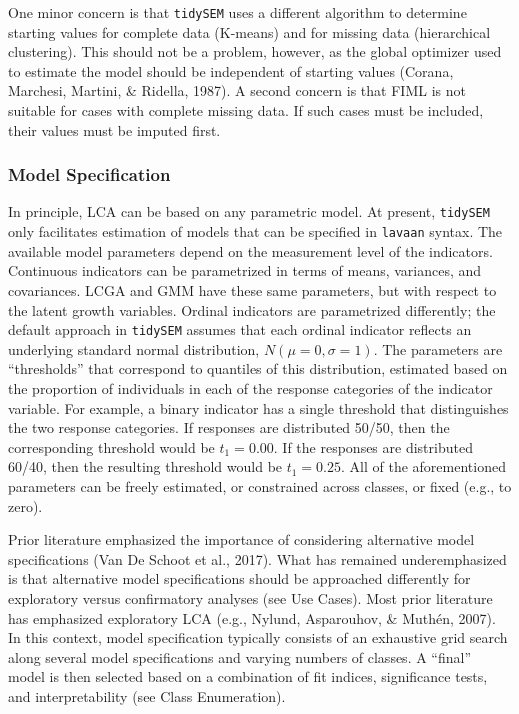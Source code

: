 \documentclass[
  ,man,floatsintext]{apa6}
\begin{document}
One minor concern is that \texttt{tidySEM} uses a different algorithm to determine starting values for complete data (K-means) and for missing data (hierarchical clustering).
This should not be a problem, however, as the global optimizer used to estimate the model should be independent of starting values (Corana, Marchesi, Martini, \& Ridella, 1987).
A second concern is that FIML is not suitable for cases with complete missing data.
If such cases must be included, their values must be imputed first.

\hypertarget{model-specification}{%
\subsubsection{Model Specification}\label{model-specification}}

In principle, LCA can be based on any parametric model.
At present, \texttt{tidySEM} only facilitates estimation of models that can be specified in \texttt{lavaan} syntax.
The available model parameters depend on the measurement level of the indicators.
Continuous indicators can be parametrized in terms of means, variances, and covariances.
LCGA and GMM have these same parameters,
but with respect to the latent growth variables.
Ordinal indicators are parametrized differently;
the default approach in \texttt{tidySEM} assumes that each ordinal indicator reflects an underlying standard normal distribution, \(N(\mu = 0, \sigma = 1)\).
The parameters are ``thresholds'' that correspond to quantiles of this distribution, estimated based on the proportion of individuals in each of the
response categories of the indicator variable.
For example, a binary
indicator has a single threshold that distinguishes the two response
categories. If responses are distributed 50/50, then the corresponding
threshold would be \(t_1 = 0.00\). If the responses are distributed 60/40,
then the resulting threshold would be \(t_1 = 0.25\).
All of the aforementioned parameters can be freely estimated,
or constrained across classes, or fixed (e.g., to zero).

Prior literature emphasized the importance of considering alternative model specifications (Van De Schoot et al., 2017).
What has remained underemphasized is that alternative model specifications should be approached differently for exploratory versus confirmatory analyses (see Use Cases).
Most prior literature has emphasized exploratory LCA (e.g., Nylund, Asparouhov, \& Muthén, 2007).
In this context, model specification typically consists of an exhaustive grid search along several model specifications and varying numbers of classes.
A ``final'' model is then selected based on a combination of fit indices,
significance tests,
and interpretability (see Class Enumeration).
\end{document}

